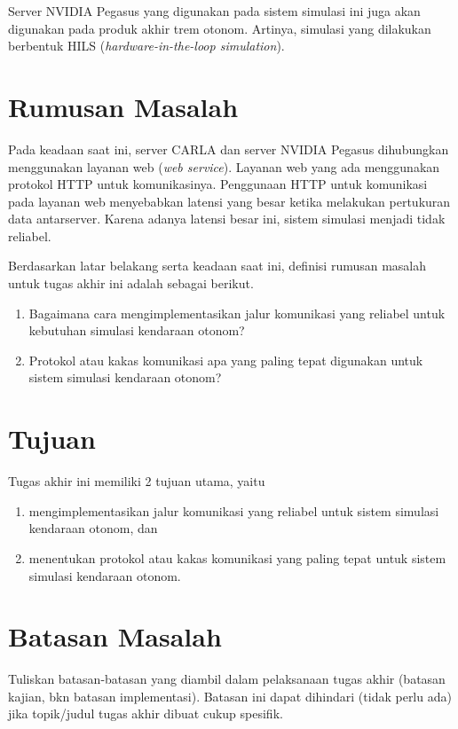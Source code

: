 Server NVIDIA Pegasus yang digunakan pada sistem simulasi ini juga akan
digunakan pada produk akhir trem otonom. Artinya, simulasi yang dilakukan
berbentuk HILS (\textit{hardware-in-the-loop simulation}).

\section{Rumusan Masalah}

Pada keadaan saat ini, server CARLA dan server NVIDIA Pegasus dihubungkan
menggunakan layanan web (\textit{web service}). Layanan web yang ada menggunakan
protokol HTTP untuk komunikasinya. Penggunaan HTTP untuk komunikasi pada layanan
web menyebabkan latensi yang besar ketika melakukan pertukuran data
antarserver. Karena adanya latensi besar ini, sistem simulasi menjadi tidak reliabel.

Berdasarkan latar belakang serta keadaan saat ini, definisi rumusan masalah
untuk tugas akhir ini adalah sebagai berikut.
\begin{enumerate}
	\item Bagaimana cara mengimplementasikan jalur komunikasi yang reliabel
	      untuk kebutuhan simulasi kendaraan otonom?
	\item Protokol atau kakas komunikasi apa yang paling tepat digunakan untuk
	      sistem simulasi kendaraan otonom?
\end{enumerate}

\section{Tujuan}

Tugas akhir ini memiliki 2 tujuan utama, yaitu
\begin{enumerate}
	\item mengimplementasikan jalur komunikasi yang reliabel untuk sistem
	      simulasi kendaraan otonom, dan
	\item menentukan protokol atau kakas komunikasi yang paling tepat untuk
	      sistem simulasi kendaraan otonom.
\end{enumerate}

\section{Batasan Masalah}

Tuliskan batasan-batasan yang diambil dalam pelaksanaan tugas akhir (batasan
kajian, bkn batasan implementasi). Batasan ini dapat dihindari (tidak perlu ada)
jika topik/judul tugas akhir dibuat cukup spesifik.

